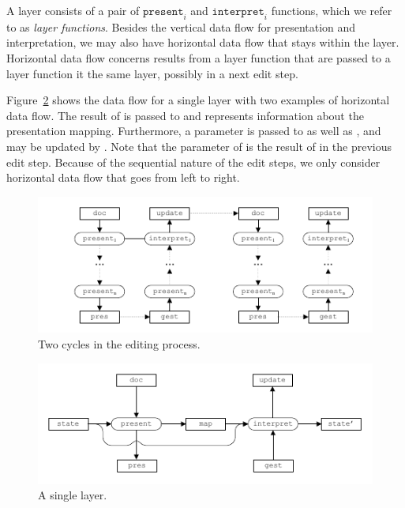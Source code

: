 \documentclass[preprint,natbib]{sigplanconf}
\begin{document}
A layer consists of a pair of $\mathtt{present}_i$ and $\mathtt{interpret}_i$ functions, which we refer to as {\em layer functions}. Besides the vertical data flow for presentation and interpretation, we may also have horizontal data flow that stays within the layer. Horizontal data flow concerns results from a layer function that are passed to a layer function it the same layer, possibly in a next edit step.

Figure~\ref{simplesinglelayer} shows the data flow for a single layer with two examples of horizontal data flow. The  result of  is passed to  and represents information about the presentation mapping. Furthermore, a  parameter is passed to  as well as , and may be updated by . Note that the  parameter of  is the result of  in the previous edit step. Because of the sequential nature of the edit steps, we only consider horizontal data flow that goes from left to right.





\begin{figure}
\includegraphics[width=\columnwidth]{images/EditCycles}
\caption{Two cycles in the editing process.}\label{simpleeditprocess} 
\end{figure}



\begin{figure}
\includegraphics[width=\columnwidth]{images/SingleLayer}
\caption{A single layer.}\label{simplesinglelayer} 
\end{figure}
\end{document}

